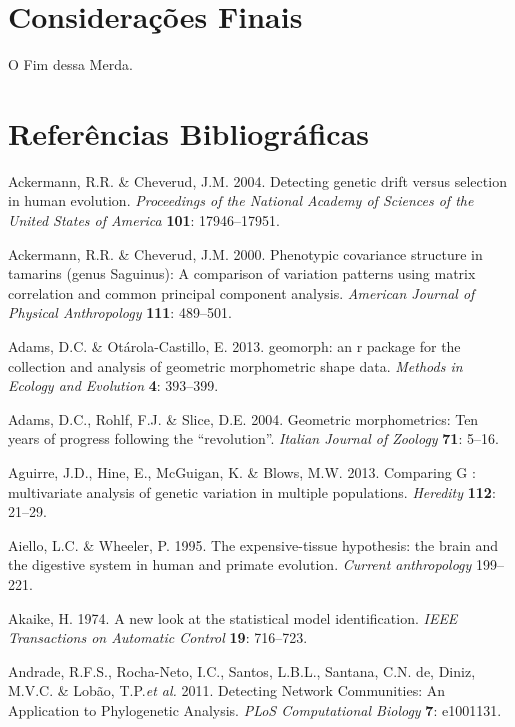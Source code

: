 \documentclass[12pt,twoside]{report}
\begin{document}

\newpage
\chapter{Considerações Finais}
\label{ch:fin}

O Fim dessa Merda.

\newpage

\pagestyle{plain}

\chapter*{Referências Bibliográficas}


Ackermann, R.R. \& Cheverud, J.M. 2004. Detecting genetic drift versus
selection in human evolution. \emph{Proceedings of the National Academy
of Sciences of the United States of America} \textbf{101}: 17946--17951.

Ackermann, R.R. \& Cheverud, J.M. 2000. Phenotypic covariance structure
in tamarins (genus Saguinus): A comparison of variation patterns using
matrix correlation and common principal component analysis.
\emph{American Journal of Physical Anthropology} \textbf{111}: 489--501.

Adams, D.C. \& Otárola-Castillo, E. 2013. geomorph: an r package for the
collection and analysis of geometric morphometric shape data.
\emph{Methods in Ecology and Evolution} \textbf{4}: 393--399.

Adams, D.C., Rohlf, F.J. \& Slice, D.E. 2004. Geometric morphometrics:
Ten years of progress following the ``revolution''. \emph{Italian
Journal of Zoology} \textbf{71}: 5--16.

Aguirre, J.D., Hine, E., McGuigan, K. \& Blows, M.W. 2013. Comparing G :
multivariate analysis of genetic variation in multiple populations.
\emph{Heredity} \textbf{112}: 21--29.

Aiello, L.C. \& Wheeler, P. 1995. The expensive-tissue hypothesis: the
brain and the digestive system in human and primate evolution.
\emph{Current anthropology} 199--221.

Akaike, H. 1974. A new look at the statistical model identification.
\emph{IEEE Transactions on Automatic Control} \textbf{19}: 716--723.

Andrade, R.F.S., Rocha-Neto, I.C., Santos, L.B.L., Santana, C.N. de,
Diniz, M.V.C. \& Lobão, T.P.\emph{et al.} 2011. Detecting Network
Communities: An Application to Phylogenetic Analysis. \emph{PLoS
Computational Biology} \textbf{7}: e1001131.
\end{document}
